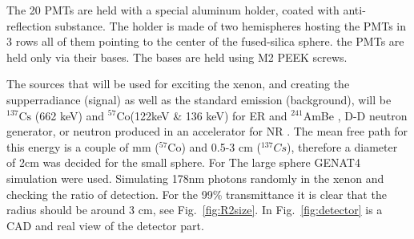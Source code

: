 The 20 PMTs are held with a special aluminum holder, coated with anti-reflection substance. The holder is made of two hemispheres hosting the PMTs in 3 rows all of them pointing to the center of the fused-silica sphere. the PMTs are held only via their bases. The bases are held using M2 PEEK screws.


The sources that will be used for exciting the xenon, and creating the supperradiance (signal) as well as the standard emission (background), will be $^{137} \mathrm{Cs}$ (662 keV) and $^{57} \mathrm{Co}$(122keV \& 136 keV) for ER and $^241$AmBe , D-D neutron generator, or neutron produced in an accelerator for NR . The mean free path for this energy is a couple of mm ($^{57} \mathrm{Co}$) and 0.5-3 cm ($^{137} Cs$), therefore a diameter of 2cm was decided for the small sphere. For The large sphere GENAT4 simulation were used. Simulating 178nm photons randomly in the xenon and checking the ratio of detection. For the 99\% transmittance it is clear that the radius should be around 3 cm, see Fig.~\ref{fig:R2size}. In Fig.~\ref{fig:detector} is a CAD and real view of the detector part.

